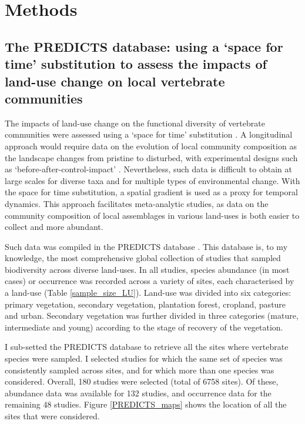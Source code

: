 \section{Methods}

\subsection{The PREDICTS database: using a `space for time' substitution to assess the impacts of land-use change on local vertebrate communities}
The impacts of land-use change on the functional diversity of vertebrate communities were assessed using a `space for time' substitution \citep{depalma2018}. A longitudinal approach would require data on the evolution of local community composition as the landscape changes from pristine to disturbed, with experimental designs such as `before-after-control-impact' \citep{depalma2018}. Nevertheless, such data is difficult to obtain at large scales for diverse taxa and for multiple types of environmental change. With the space for time substitution, a spatial gradient is used as a proxy for temporal dynamics. This approach facilitates meta-analytic studies, as data on the community composition of local assemblages in various land-uses is both easier to collect and more abundant. 

Such data was compiled in the PREDICTS database \citep{Hudson2014, Hudson2017}. This database is, to my knowledge, the most comprehensive global collection of studies that sampled biodiversity across diverse land-uses. In all studies, species abundance (in most cases) or occurrence was recorded across a variety of sites, each characterised by a land-use (Table \ref{sample_size_LU}). Land-use was divided into six categories: primary vegetation, secondary vegetation, plantation forest, cropland, pasture and urban. Secondary vegetation was further divided in three categories (mature, intermediate and young) according to the stage of recovery of the vegetation. 

I sub-setted the PREDICTS database to retrieve all the sites where vertebrate species were sampled. I selected studies for which the same set of species was consistently sampled across sites, and for which more than one species was considered. Overall, 180 studies were selected (total of 6758 sites). Of these, abundance data was available for 132 studies, and occurrence data for the remaining 48 studies. Figure \ref{PREDICTS_maps} shows the location of all the sites that were considered.


